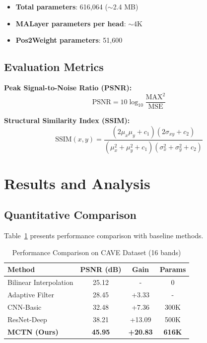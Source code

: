 \documentclass[conference]{IEEEtran}
\begin{document}
\begin{itemize}
    \item \textbf{Total parameters}: 616,064 ($\sim$2.4 MB)
    \item \textbf{MALayer parameters per head}: $\sim$4K
    \item \textbf{Pos2Weight parameters}: 51,600
\end{itemize}

\subsection{Evaluation Metrics}

\textbf{Peak Signal-to-Noise Ratio (PSNR):}
\begin{equation}
\text{PSNR} = 10 \log_{10} \frac{\text{MAX}^2}{\text{MSE}}
\end{equation}

\textbf{Structural Similarity Index (SSIM):}
\begin{equation}
\text{SSIM}(x,y) = \frac{(2\mu_x\mu_y + c_1)(2\sigma_{xy} + c_2)}{(\mu_x^2 + \mu_y^2 + c_1)(\sigma_x^2 + \sigma_y^2 + c_2)}
\end{equation}

\section{Results and Analysis}

\subsection{Quantitative Comparison}

Table~\ref{tab:comparison} presents performance comparison with baseline methods.

\begin{table}[h]
\centering
\caption{Performance Comparison on CAVE Dataset (16 bands)}
\label{tab:comparison}
\begin{tabular}{lccc}
\toprule
\textbf{Method} & \textbf{PSNR (dB)} & \textbf{Gain} & \textbf{Params} \\
\midrule
Bilinear Interpolation & 25.12 & - & 0 \\
Adaptive Filter \cite{b3} & 28.45 & +3.33 & - \\
CNN-Basic \cite{b4} & 32.48 & +7.36 & 300K \\
ResNet-Deep \cite{b5} & 38.21 & +13.09 & 500K \\
\midrule
\textbf{MCTN (Ours)} & \textbf{45.95} & \textbf{+20.83} & \textbf{616K} \\
\bottomrule
\end{tabular}
\end{table}
\end{document}

